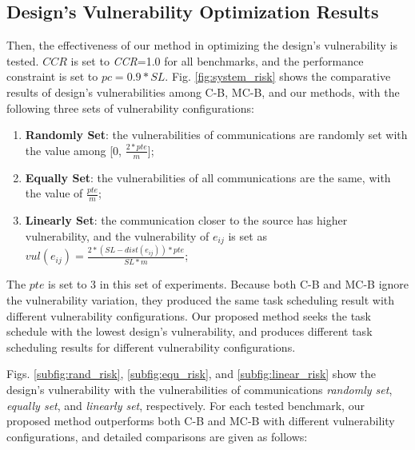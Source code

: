 \documentclass[10pt,journal, compsoc]{IEEEtran}
\begin{document}
\subsection{Design's Vulnerability Optimization Results}

Then, the effectiveness of our method in optimizing the design's vulnerability is tested. $CCR$ is set to \textit{CCR}=1.0 for all benchmarks, and the performance constraint is set to $pc=0.9*SL$. Fig. \ref{fig:system_risk} shows the comparative results of design's vulnerabilities among C-B, MC-B, and our methods, with the following three sets of vulnerability configurations:


\begin{enumerate}
\item \textbf{Randomly Set}: the vulnerabilities of communications are randomly set with the value among [0, $\frac{2*pte}{m}$];
\item \textbf{Equally Set}: the vulnerabilities of all communications are the same, with the value of $\frac{pte}{m}$;
\item \textbf{Linearly Set}: the communication closer to the source has higher vulnerability, and the vulnerability of $e_{ij}$ is set as $vul(e_{ij})=\frac{2*(SL-dist(e_{ij}))*pte}{SL*m}$;
\end{enumerate}



The $pte$ is set to 3 in this set of experiments. Because both C-B and MC-B ignore the vulnerability variation, they produced the same task scheduling result with different vulnerability configurations. Our proposed method seeks the task schedule with the lowest design's vulnerability, and produces different task scheduling results for different vulnerability configurations.


Figs. \ref{subfig:rand_risk}, \ref{subfig:equ_risk}, and \ref{subfig:linear_risk} show the design's vulnerability with the vulnerabilities of communications \textit{randomly set}, \textit{equally set}, and \textit{linearly set}, respectively. For each tested benchmark, our proposed method outperforms both C-B and MC-B with different vulnerability configurations, and detailed comparisons are given as follows:
\end{document}

